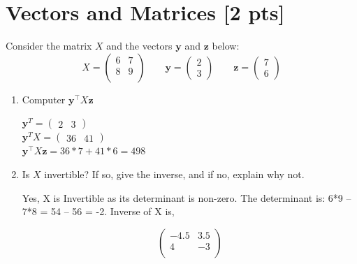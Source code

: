\documentclass[a4paper]{article}
\theoremstyle{definition}
\newenvironment{soln}{
    \leavevmode\color{blue}\ignorespaces
}{}
\begin{document}
\section{Vectors and Matrices [2 pts]}
Consider the matrix $X$ and the vectors $\mathbf{y}$ and $\textbf{z}$ below:
$$
X = \begin{pmatrix}
6 & 7 \\ 8 & 9 \\
\end{pmatrix}
\qquad \mathbf{y} = \begin{pmatrix}
2 \\ 3
\end{pmatrix} \qquad \mathbf{z} = \begin{pmatrix}
7 \\ 6
\end{pmatrix}
$$
\begin{enumerate}
	\item 	Computer $\mathbf{y}^\top X \mathbf{z}$\\
	    \begin{soln} 
				
				$\mathbf{y}^{T} = \begin{pmatrix}
				2 & 3
				\end{pmatrix} $\\

				$\mathbf{y}^{T} X = \begin{pmatrix}
				36 & 41
				\end{pmatrix} $\\

	 $\mathbf{y}^\top X \mathbf{z} = 36*7 + 41*6 = 498 
	$\\	


	    \end{soln}

	\item 	Is $X$ invertible? If so, give the inverse, and if no, explain why not.\\
        \begin{soln}  
		
		Yes, X is Invertible as its determinant is non-zero. The determinant is: 6*9 – 7*8 = 54 – 56 = -2.
		Inverse of X is,
	
				   $$	
				    \begin{pmatrix} -4.5 & 3.5 \\ 4 & -3 \\\end{pmatrix}			
				  $$	
	 \end{soln}
\end{enumerate}
\end{document}
